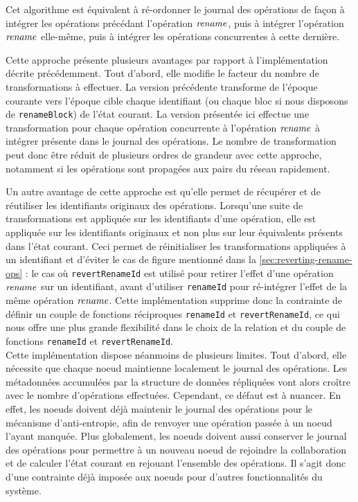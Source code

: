Cet algorithme est équivalent à ré-ordonner le journal des opérations de façon à intégrer les opérations précédant l'opération $\mathit{rename}$, puis à intégrer l'opération $\mathit{rename}$ elle-même, puis à intégrer les opérations concurrentes à cette dernière.

Cette approche présente plusieurs avantages par rapport à l'implémentation décrite précédemment.
Tout d'abord, elle modifie le facteur du nombre de transformations à effectuer.
La version précédente transforme de l'époque courante vers l'époque cible chaque identifiant (ou chaque bloc si nous disposons de \texttt{renameBlock}) de l'état courant.
La version présentée ici effectue une transformation pour chaque opération concurrente à l'opération $\mathit{rename}$ à intégrer présente dans le journal des opérations.
Le nombre de transformation peut donc être réduit de plusieurs ordres de grandeur avec cette approche, notamment si les opérations sont propagées aux pairs du réseau rapidement.

Un autre avantage de cette approche est qu'elle permet de récupérer et de réutiliser les identifiants originaux des opérations.
Lorsqu'une suite de transformations est appliquée sur les identifiants d'une opération, elle est appliquée sur les identifiants originaux et non plus sur leur équivalents présents dans l'état courant.
Ceci permet de réinitialiser les transformations appliquées à un identifiant et d'éviter le cas de figure mentionné dans la \autoref{sec:reverting-rename-ops} : le cas où \texttt{revertRenameId} est utilisé pour retirer l'effet d'une opération $\mathit{rename}$ sur un identifiant, avant d'utiliser \texttt{renameId} pour ré-intégrer l'effet de la même opération $\mathit{rename}$.
Cette implémentation supprime donc la contrainte de définir un couple de fonctions réciproques \texttt{renameId} et \texttt{revertRenameId}, ce qui nous offre une plus grande flexibilité dans le choix de la relation \lepoch et du couple de fonctions \texttt{renameId} et \texttt{revertRenameId}.\\

Cette implémentation dispose néanmoins de plusieurs limites.
Tout d'abord, elle nécessite que chaque noeud maintienne localement le journal des opérations.
Les métadonnées accumulées par la structure de données répliquées vont alors croître avec le nombre d'opérations effectuées.
Cependant, ce défaut est à nuancer.
En effet, les noeuds doivent déjà maintenir le journal des opérations pour le mécanisme d'anti-entropie, afin de renvoyer une opération passée à un noeud l'ayant manquée.
Plus globalement, les noeuds doivent aussi conserver le journal des opérations pour permettre à un nouveau noeud de rejoindre la collaboration et de calculer l'état courant en rejouant l'ensemble des opérations.
Il s'agit donc d'une contrainte déjà imposée aux noeuds pour d'autres fonctionnalités du système.


